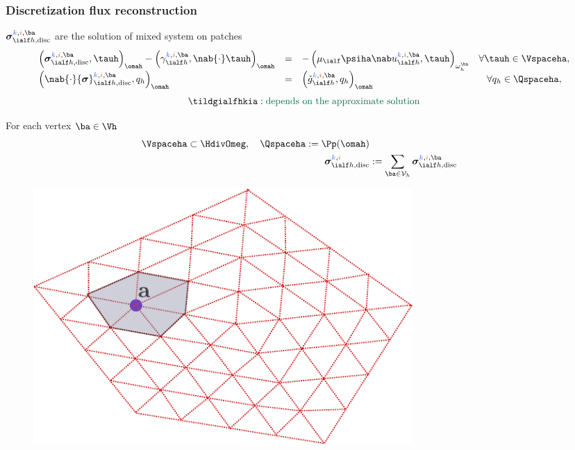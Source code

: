 \begin{frame}
\frametitle{Discretization flux reconstruction}
  ${\bm \sigma}_{\ialf h, \mathrm{disc}}^{\kk,\ii,\ba}$ are the solution of mixed system on patches
\begin{equation*}
\begin{array}{lclcc}
\left({\bm \sigma}_{\ialf h, \mathrm{disc}}^{\kk,\ii,\ba}, \tauh\right)_{\omah}- \left(\gamma_{\ialf h}^{\kk,\ii,\ba},\nab {\cdot} \tauh\right)_{\omah}
&=& -\left(\mu_\ialf \psiha \nab u_{\ialf h}^{\kk,\ii,\ba}, \tauh \right)_{\omega_h^{\ba}}
&  \forall \tauh\in \Vspaceha, \\
\left(\nab {\cdot} {\bm \sigma}_{\ialf h, \mathrm{disc}}^{\kk,\ii, \ba}, q_{h}\right)_{\omah}
&=&\left(\tilde{g}_{\ialf h}^{\kk,\ii,\ba}, q_{h}\right)_{\omah}
&  \forall q_{h}\in \Qspaceha,
\end{array}
\end{equation*}
\begin{equation*}
\tildgialfhkia  : \mbox{\textcolor{cadmiumgreen}{depends on the approximate solution}} 
\end{equation*}
\begin{minipage}[c]{0.4 \linewidth}
For each vertex $ \ba \in \Vh$
\vspace{-0.2 cm}
\begin{equation*}
\begin{split}
  \Vspaceha \subset \HdivOmeg, \quad
 \Qspaceha  \egaldef \Pp(\omah) \\
 {\bm \sigma}_{\ialf h, \mathrm{disc}}^{\kk,\ii} & \egaldef \sum_{\ba \in \mathcal{V}_h} {\bm \sigma}_{\ialf h, \mathrm{disc}}^{\kk,\ii,\ba}
\end{split}
\vspace{-0.2 cm}
\end{equation*}

\end{minipage}
\hfill
\begin{minipage}[c]{0.5 \linewidth}
\begin{figure}
    \includegraphics[width=0.7\textwidth]{patch_alg_5.pdf}
\end{figure}
\end{minipage}
\end{frame}

